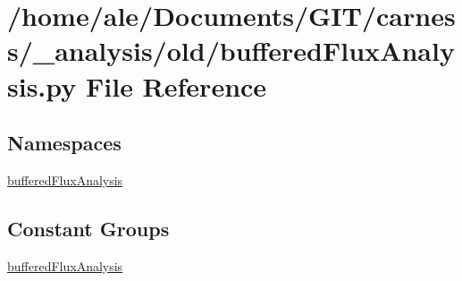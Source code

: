 \hypertarget{a00018}{\section{/home/ale/\-Documents/\-G\-I\-T/carness/\-\_\-analysis/old/buffered\-Flux\-Analysis.py File Reference}
\label{a00018}
}
\subsection*{Namespaces}
\begin{DoxyCompactItemize}
\item 
\hyperlink{a00099}{buffered\-Flux\-Analysis}
\end{DoxyCompactItemize}
\subsection*{Constant Groups}
\begin{DoxyCompactItemize}
\item 
\hyperlink{a00099}{buffered\-Flux\-Analysis}
\end{DoxyCompactItemize}
